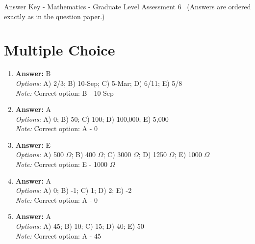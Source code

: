 \documentclass[12pt]{article}
\begin{document}
\begin{center}
Answer Key - Mathematics - Graduate Level Assessment 6 \
\small (Answers are ordered exactly as in the question paper.)
\end{center}

\section*{Multiple Choice}
\begin{enumerate}[label=\arabic*.]
\item \textbf{Answer:} B
\\ \textit{Options:} A) 2/3; B) 10-Sep; C) 5-Mar; D) 6/11; E) 5/8
\\ \textit{Note:} Correct option: B - 10-Sep
\item \textbf{Answer:} A
\\ \textit{Options:} A) 0; B) 50; C) 100; D) 100,000; E) 5,000
\\ \textit{Note:} Correct option: A - 0
\item \textbf{Answer:} E
\\ \textit{Options:} A) 500 $\Omega$; B) 400 $\Omega$; C) 3000 $\Omega$; D) 1250 $\Omega$; E) 1000 $\Omega$
\\ \textit{Note:} Correct option: E - 1000 $\Omega$
\item \textbf{Answer:} A
\\ \textit{Options:} A) 0; B) -1; C) 1; D) 2; E) -2
\\ \textit{Note:} Correct option: A - 0
\item \textbf{Answer:} A
\\ \textit{Options:} A) 45; B) 10; C) 15; D) 40; E) 50
\\ \textit{Note:} Correct option: A - 45
\end{enumerate}
\end{document}
